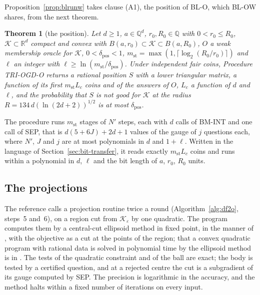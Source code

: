 \documentclass[11pt]{amsart}
\newtheorem{theorem}{Theorem}[section]
\theoremstyle{definition}
\numberwithin{equation}{section}
\newcommand{\R}{\mathbb{R}}
\newcommand{\cK}{\mathcal{K}}
\begin{document}
Proposition~\ref{prop:blrunw} takes clause (A1), the position of BL-O, which BL-OW shares, from the next theorem.

\begin{theorem}[the position]\label{thm:pos}
Let $d\ge1$, $a\in\mathbb Q^d$, $r_0,R_0\in\mathbb Q$ with $0<r_0\le R_0$, $\cK\subset\R^d$ compact and convex with $B(a,r_0)\subset\cK\subset B(a,R_0)$, $O$ a weak membership oracle for $\cK$, $0<\delta_{\mathrm{pos}}<1$, $m_{\mathrm{st}}=\max(1,\lceil\log_2(R_0/r_0)\rceil)$ and $\ell$ an integer with $\ell\ge\ln(m_{\mathrm{st}}/\delta_{\mathrm{pos}})$. Under independent fair coins, Procedure TRI-OGD-O returns a rational position $S$ with a lower triangular matrix, a function of its first $m_{\mathrm{st}}L_c$ coins and of the answers of $O$, $L_c$ a function of $d$ and $\ell$, and the probability that $S$ is not good for $\cK$ at the radius $R=134\,d(\ln(2d+2))^{1/2}$ is at most $\delta_{\mathrm{pos}}$.
\end{theorem}

The procedure runs $m_{\mathrm{st}}$ stages of $N'$ steps, each with $d$ calls of BM-INT and one call of SEP, that is $d(5+6J)+2d+1$ values of the gauge of $j$ questions each, where $N'$, $J$ and $j$ are at most polynomials in $d$ and $1+\ell$. Written in the language of Section~\ref{sec:bit-transfer}, it reads exactly $m_{\mathrm{st}}L_c$ coins and runs within a polynomial in $d$, $\ell$ and the bit length of $a$, $r_0$, $R_0$ units.

\subsection{The projections}\label{sec:bit-proj}

The reference calls a projection routine twice a round (Algorithm~\ref{alg:df2o}, steps~5 and~6), on a region cut from $\cK_\varepsilon$ by one quadratic. The program computes them by a central-cut ellipsoid method in fixed point, in the manner of \cite[Theorem~(3.2.1)]{GLS93}, with the objective as a cut at the points of the region; that a convex quadratic program with rational data is solved in polynomial time by the ellipsoid method is in \cite{KTK80}. The tests of the quadratic constraint and of the ball are exact; the body is tested by a certified question, and at a rejected centre the cut is a subgradient of its gauge computed by SEP. The precision is logarithmic in the accuracy, and the method halts within a fixed number of iterations on every input.
\end{document}
